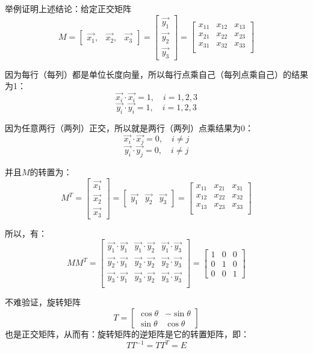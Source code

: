 \documentclass[12pt]{article}
\begin{document}
\begin{framed}
\small{
举例证明上述结论：给定正交矩阵
$$
M = \begin{bmatrix}
\vec{x_1}, & \vec{x_2}, &\vec{x_3}
\end{bmatrix} = 
\begin{bmatrix}
\vec{y_1} \\ \vec{y_2} \\ \vec{y_3}
\end{bmatrix} = 
\begin{bmatrix}
x_{11} & x_{12} & x_{13} \\
x_{21} & x_{22} & x_{23} \\
x_{31} & x_{32} & x_{33} \\
\end{bmatrix}
$$

因为每行（每列）都是单位长度向量，所以每行点乘自己（每列点乘自己）的结果为1：
$$
\vec{x_i}\cdot\vec{x_i} = 1, \quad i = 1, 2, 3
$$
$$
\vec{y_i}\cdot\vec{y_i} = 1, \quad i = 1, 2, 3
$$

因为任意两行（两列）正交，所以就是两行（两列）点乘结果为0：
$$
\vec{x_i}\cdot\vec{x_j} = 0, \quad i \ne j
$$
$$
\vec{y_i}\cdot\vec{y_j} = 0, \quad i \ne j
$$

并且$M$的转置为：
$$
M^T = \begin{bmatrix}
\vec{x_1} \\ \vec{x_2} \\ \vec{x_3}
\end{bmatrix} = 
\begin{bmatrix}
\vec{y_1} & \vec{y_2} & \vec{y_3}
\end{bmatrix} = 
\begin{bmatrix}
x_{11} & x_{21} & x_{31} \\
x_{12} & x_{22} & x_{32} \\
x_{13} & x_{23} & x_{33} \\
\end{bmatrix}
$$

所以，有：
$$
MM^T = \begin{bmatrix}
\vec{y_1}\cdot\vec{y_1} & \vec{y_1}\cdot\vec{y_2} & \vec{y_1}\cdot\vec{y_3} \\
\vec{y_2}\cdot\vec{y_1} & \vec{y_2}\cdot\vec{y_2} & \vec{y_2}\cdot\vec{y_3} \\
\vec{y_3}\cdot\vec{y_1} & \vec{y_3}\cdot\vec{y_2} & \vec{y_3}\cdot\vec{y_3} \\
\end{bmatrix} = 
\begin{bmatrix}
1 & 0 & 0 \\ 0 & 1 & 0 \\ 0 & 0 & 1
\end{bmatrix}
$$

不难验证，旋转矩阵
$$
T = \begin{bmatrix}
\cos\theta & -\sin\theta \\ \sin\theta & \cos\theta
\end{bmatrix}
$$
也是正交矩阵，从而有：旋转矩阵的逆矩阵是它的转置矩阵，即：
$$
TT^{-1} = TT^T = E
$$
}
\end{framed}
\end{document}
